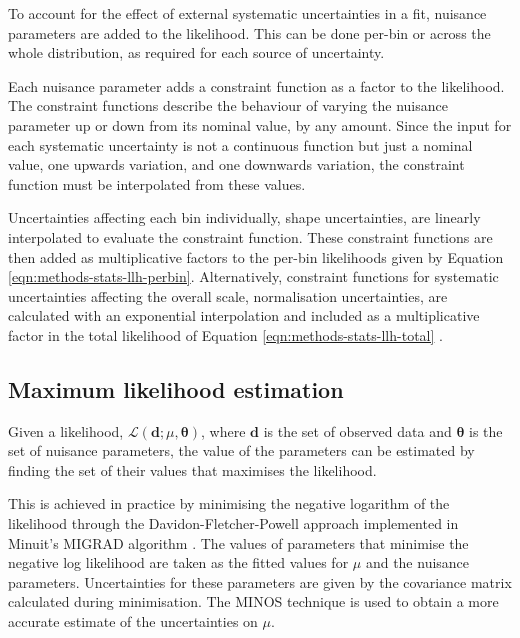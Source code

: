 To account for the effect of external systematic uncertainties in a fit,
nuisance parameters are added to the likelihood. This can be done per-bin or
across the whole distribution, as required for each source of uncertainty.

Each nuisance parameter adds a constraint function as a factor to the
likelihood. The constraint functions describe the behaviour of varying the
nuisance parameter up or down from its nominal value, by any amount. Since the
input for each systematic uncertainty is not a continuous function but just a
nominal value, one upwards variation, and one downwards variation, the
constraint function must be interpolated from these values.

Uncertainties affecting each bin individually, shape uncertainties, are linearly
interpolated to evaluate the constraint function. These constraint functions are
then added as multiplicative factors to the per-bin likelihoods given by
Equation \ref{eqn:methods-stats-llh-perbin}. Alternatively, constraint functions
for systematic uncertainties affecting the overall scale, normalisation
uncertainties, are calculated with an exponential interpolation and included as
a multiplicative factor in the total likelihood of Equation
\ref{eqn:methods-stats-llh-total} \cite{Cranmer2012}.

\subsection{Maximum likelihood estimation}

\newcommand\dvec{\ensuremath{\mathbf{d}}\xspace}
\newcommand\thetavec{\ensuremath{\boldsymbol{\theta}}\xspace}
Given a likelihood, $\mathcal{L}(\dvec;\mu,\thetavec)$, where \dvec is the set
of observed data and \thetavec is the set of nuisance parameters, the value of
the parameters can be estimated by finding the set of their values that
maximises the likelihood.

This is achieved in practice by minimising the negative logarithm of the
likelihood through the Davidon-Fletcher-Powell approach
\cite{Davidon1959,Fletcher1970,Powell1983} implemented in Minuit's MIGRAD
algorithm \cite{Minuit2}.  The values of parameters that minimise the negative
log likelihood are taken as the fitted values for $\mu$ and the nuisance
parameters. Uncertainties for these parameters are given by the covariance
matrix calculated during minimisation. The MINOS technique \cite{Minuit2} is
used to obtain a more accurate estimate of the uncertainties on $\mu$.

